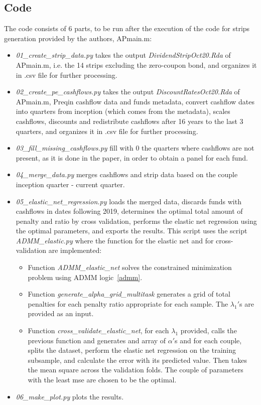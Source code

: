 \documentclass[12pt]{article}
\begin{document}
    \subsection{Code}
    The code consists of 6 parts, to be run after the execution of the code for strips generation provided by the authors, APmain.m:
    \begin{itemize}
        \item \textit{01\_create\_strip\_data.py} takes the output \textit{DividendStripOct20.Rda} of APmain.m, i.e. the 14 strips excluding the zero-coupon bond, and organizes it in .csv file for further processing.
        \item \textit{02\_create\_pe\_cashflows.py} takes the output \textit{DiscountRatesOct20.Rda} of APmain.m, Preqin cashflow data and funds metadata, convert cashflow dates into quarters from inception (which comes from the metadata), scales cashflows, discounts and redistribute cashflows after 16 years to the last 3 quarters, and organizes it in .csv file for further processing.
        \item \textit{03\_fill\_missing\_cashflows.py} fill with 0 the quarters where cashflows are not present, as it is done in the paper, in order to obtain a panel for each fund.
        \item \textit{04\_merge\_data.py} merges cashflows and strip data based on the couple inception quarter - current quarter.
        \item \textit{05\_elastic\_net\_regression.py} loads the merged data, discards funds with cashflows in dates following 2019, determines the optimal total amount of penalty and ratio by cross validation, performs the elastic net regression using the optimal parameters, and exports the results.
        This script uses the script \textit{ADMM\_elastic.py} where the function for the elastic net and for cross-validation are implemented:
        \begin{itemize}
            \item Function \textit{ADMM\_elastic\_net} solves the constrained minimization problem using ADMM logic~\ref{admm}.
            \item Function \textit{generate\_alpha\_grid\_multitask} generates a grid of total penalties for each penalty ratio appropriate for each sample.
            The $\lambda_1$\('\)s are provided as an input.
            \item Function \textit{cross\_validate\_elastic\_net}, for each $\lambda_1$ provided, calls the previous function and generates and array of $\alpha$\('\)s and for each couple, splits the dataset, perform the elastic net regression on the training subsample, and calculate the error with its predicted value.
            Then takes the mean square across the validation folds.
            The couple of parameters with the least mse are chosen to be the optimal.
        \end{itemize}
        \item \textit{06\_make\_plot.py} plots the results.
    \end{itemize}
\end{document}
